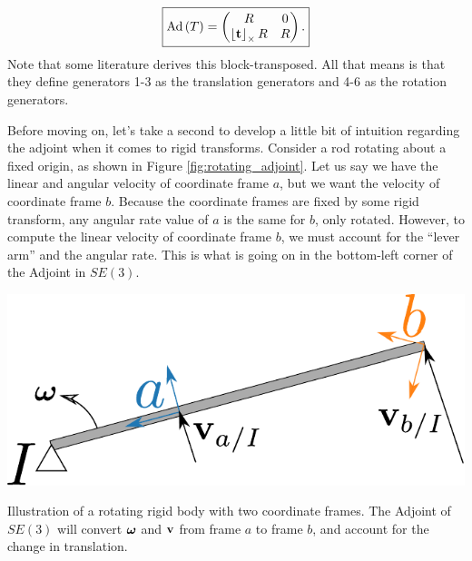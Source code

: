 \[
\boxed{\textnormal{Ad}\left(T\right)=\begin{pmatrix}R & 0\\
\left\lfloor\mathbf{t}\right\rfloor_{\times}R & R
\end{pmatrix}.}
\]
Note that some literature\cite{Drummond2014,Ethan2019} derives this
block-transposed. All that means is that they define generators 1-3
as the translation generators and 4-6 as the rotation generators.

Before moving on, let's take a second to develop a little bit of intuition
regarding the adjoint when it comes to rigid transforms. Consider
a rod rotating about a fixed origin, as shown in Figure \ref{fig:rotating_adjoint}.
Let us say we have the linear and angular velocity of coordinate frame
$a$, but we want the velocity of coordinate frame $b$. Because the
coordinate frames are fixed by some rigid transform, any angular rate
value of $a$ is the same for $b$, only rotated. However, to compute
the linear velocity of coordinate frame $b$, we must account for
the ``lever arm'' and the angular rate. This is what is going on
in the bottom-left corner of the Adjoint in $SE(3).$ 

\begin{marginfigure}
\includegraphics[width=\linewidth]{chap2_preliminaries/figures/rotating_bar}
\caption{Illustration of a rotating rigid body with two coordinate frames.
The Adjoint of $SE(3)$ will convert $\boldsymbol{\omega}$
and $\mathbf{v}$ from frame $a$ to frame $b$, and account for the
change in translation. }
\label{fig:rotating_adjoint}
\end{marginfigure}

